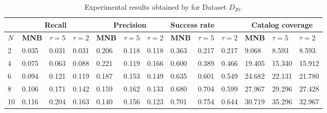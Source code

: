 \begin{table*}[t!]
	\small
	\caption{Experimental results obtained by \TFb for Dataset $D_{20}$.}
	\begin{tabular}{|l | lll| lll |lll |lll|}
		\hline
		& \multicolumn{3}{c|}{\textbf{Recall}} & \multicolumn{3}{c|}{\textbf{Precision}} & \multicolumn{3}{l|}{\textbf{Success rate}} & \multicolumn{3}{c|}{ \textbf{Catalog coverage}} \\ \hline
		$N$  & \textbf{MNB}     & $\tau=5$   & $\tau=2$  & \textbf{MNB}      & $\tau=5$   & $\tau=2$   & \textbf{MNB}       & $\tau=5$   & $\tau=2$    & \textbf{MNB}        & $\tau=5$     & $\tau=2$      \\ \hline
		2  & 0.035   & 0.031   & 0.031  & 0.206    & 0.118    & 0.118   & 0.363     & 0.217    & 0.217    & 9.068     & 8.593      & 8.593      \\ \hline
		4  & 0.075   & 0.063   & 0.088  & 0.221   & 0.119    & 0.166   &  0.600     & 0.389    & 0.466    & 19.405     & 15.340     & 15.912     \\ \hline
		6  & 0.094   & 0.121   & 0.119  & 0.187    & 0.153    & 0.149   & 0.635    & 0.601    & 0.549    &  24.682     & 22.131     & 21.780     \\ \hline
		\rowcolor{Gray}
		8  & 0.106   & 0.171   & 0.142  & 0.159  & 0.162    & 0.133   &  0.680     & 0.704    & 0.599    & 27.967     & 29.296     & 27.428     \\ \hline
		10 & 0.116   & 0.204   & 0.163  & 0.140    & 0.156    & 0.123   & 0.701     & 0.754    & 0.644    & 30.719     & 35.296     & 32.967     \\ \hline

\end{tabular}
\end{table*}
